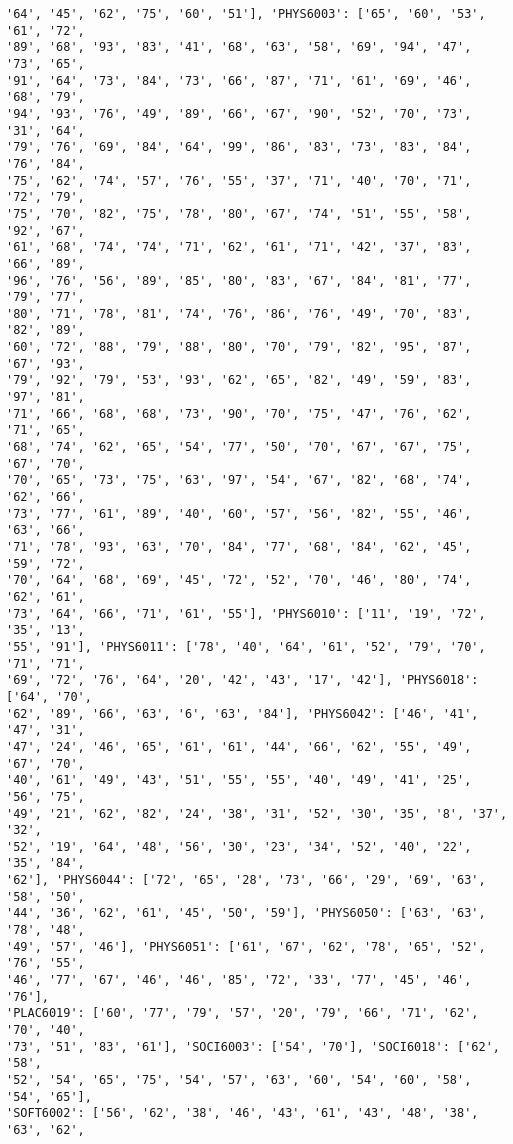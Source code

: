 \documentclass[11pt]{article}
\begin{document}
\begin{Verbatim}[commandchars=\\\{\}]
'64', '45', '62', '75', '60', '51'], 'PHYS6003': ['65', '60', '53', '61', '72',
'89', '68', '93', '83', '41', '68', '63', '58', '69', '94', '47', '73', '65',
'91', '64', '73', '84', '73', '66', '87', '71', '61', '69', '46', '68', '79',
'94', '93', '76', '49', '89', '66', '67', '90', '52', '70', '73', '31', '64',
'79', '76', '69', '84', '64', '99', '86', '83', '73', '83', '84', '76', '84',
'75', '62', '74', '57', '76', '55', '37', '71', '40', '70', '71', '72', '79',
'75', '70', '82', '75', '78', '80', '67', '74', '51', '55', '58', '92', '67',
'61', '68', '74', '74', '71', '62', '61', '71', '42', '37', '83', '66', '89',
'96', '76', '56', '89', '85', '80', '83', '67', '84', '81', '77', '79', '77',
'80', '71', '78', '81', '74', '76', '86', '76', '49', '70', '83', '82', '89',
'60', '72', '88', '79', '88', '80', '70', '79', '82', '95', '87', '67', '93',
'79', '92', '79', '53', '93', '62', '65', '82', '49', '59', '83', '97', '81',
'71', '66', '68', '68', '73', '90', '70', '75', '47', '76', '62', '71', '65',
'68', '74', '62', '65', '54', '77', '50', '70', '67', '67', '75', '67', '70',
'70', '65', '73', '75', '63', '97', '54', '67', '82', '68', '74', '62', '66',
'73', '77', '61', '89', '40', '60', '57', '56', '82', '55', '46', '63', '66',
'71', '78', '93', '63', '70', '84', '77', '68', '84', '62', '45', '59', '72',
'70', '64', '68', '69', '45', '72', '52', '70', '46', '80', '74', '62', '61',
'73', '64', '66', '71', '61', '55'], 'PHYS6010': ['11', '19', '72', '35', '13',
'55', '91'], 'PHYS6011': ['78', '40', '64', '61', '52', '79', '70', '71', '71',
'69', '72', '76', '64', '20', '42', '43', '17', '42'], 'PHYS6018': ['64', '70',
'62', '89', '66', '63', '6', '63', '84'], 'PHYS6042': ['46', '41', '47', '31',
'47', '24', '46', '65', '61', '61', '44', '66', '62', '55', '49', '67', '70',
'40', '61', '49', '43', '51', '55', '55', '40', '49', '41', '25', '56', '75',
'49', '21', '62', '82', '24', '38', '31', '52', '30', '35', '8', '37', '32',
'52', '19', '64', '48', '56', '30', '23', '34', '52', '40', '22', '35', '84',
'62'], 'PHYS6044': ['72', '65', '28', '73', '66', '29', '69', '63', '58', '50',
'44', '36', '62', '61', '45', '50', '59'], 'PHYS6050': ['63', '63', '78', '48',
'49', '57', '46'], 'PHYS6051': ['61', '67', '62', '78', '65', '52', '76', '55',
'46', '77', '67', '46', '46', '85', '72', '33', '77', '45', '46', '76'],
'PLAC6019': ['60', '77', '79', '57', '20', '79', '66', '71', '62', '70', '40',
'73', '51', '83', '61'], 'SOCI6003': ['54', '70'], 'SOCI6018': ['62', '58',
'52', '54', '65', '75', '54', '57', '63', '60', '54', '60', '58', '54', '65'],
'SOFT6002': ['56', '62', '38', '46', '43', '61', '43', '48', '38', '63', '62',

\end{Verbatim}
\end{document}
